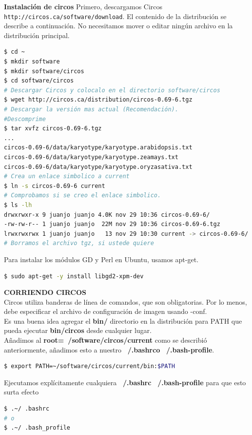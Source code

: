 \documentclass[12pt,letterpaper]{article}
\begin{document}
\textbf{Instalación de circos}
Primero, descargamos Circos \texttt{http://circos.ca/software/download}. El contenido de la distribución se describe a continuación.
No necesitamos mover o editar ningún archivo en la distribución principal.
\begin{lstlisting}[language=bash,caption={Suponiendo que desea instalar en ROOT=~/software/circos},style=consola]
$ cd ~
$ mkdir software
$ mkdir software/circos
$ cd software/circos
# Descargar Circos y colocalo en el directorio software/circos
$ wget http://circos.ca/distribution/circos-0.69-6.tgz
# Descargar la versión mas actual (Recomendación).
#Descomprime 
$ tar xvfz circos-0.69-6.tgz
...
circos-0.69-6/data/karyotype/karyotype.arabidopsis.txt
circos-0.69-6/data/karyotype/karyotype.zeamays.txt
circos-0.69-6/data/karyotype/karyotype.oryzasativa.txt
# Crea un enlace simbolico a current 
$ ln -s circos-0.69-6 current
# Comprobamos si se creo el enlace simbolico.
$ ls -lh
drwxrwxr-x 9 juanjo juanjo 4.0K nov 29 10:36 circos-0.69-6/
-rw-rw-r-- 1 juanjo juanjo  22M nov 29 10:36 circos-0.69-6.tgz
lrwxrwxrwx 1 juanjo juanjo   13 nov 29 10:30 current -> circos-0.69-6/
# Borramos el archivo tgz, si ustede quiere
\end{lstlisting}
Para instalar los módulos GD y Perl en Ubuntu, usamos apt-get.\\
\begin{lstlisting}[language=bash, style=consola]
$ sudo apt-get -y install libgd2-xpm-dev
\end{lstlisting}
\textbf{CORRIENDO CIRCOS}\\ 
Circos utiliza banderas de línea de comandos, que son obligatorias. Por lo menos, debe especificar el archivo de configuración de imagen usando -conf.\\
Es una buena idea agregar el \textbf{bin/} directorio en la distribución para PATH que pueda ejecutar \textbf{bin/circos} desde cualquier lugar.\\
Añadimos al \textbf{root=~/software/circos/current} como se describió anteriormente, añadimos esto a nuestro \textbf{~/.bashrco} \textbf{~/.bash-profile}.\\ 
\begin{lstlisting}[language=bash, style=consola]
$ export PATH=~/software/circos/current/bin:$PATH
\end{lstlisting}
Ejecutamos explícitamente cualquiera \textbf{~/.bashrc} \textbf{~/.bash-profile} para que esto surta efecto\\
\begin{lstlisting}[language=bash, style=consola]
$ .~/ .bashrc
# o 
$ .~/ .bash_profile
\end{lstlisting}
\end{document}
